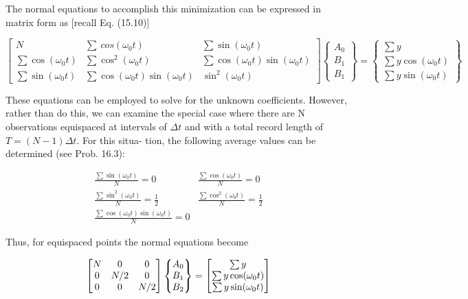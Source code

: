 \documentclass[../main.tex]{subfiles}
\begin{document}
\noindent The normal equations to accomplish this minimization can be expressed in matrix form as [recall Eq. (15.10)]

\begin{equation}
	\tag{16.12}
	\begin{bmatrix}
		N & \sum \ cos(\omega_0 t) & \sum \sin(\omega_0 t) \\
		\sum \cos(\omega_0 t) & \sum \cos^2 (\omega_0 t) & \sum \cos (\omega_0 t) \sin (\omega_0 t) \\
		\sum \sin(\omega_0 t) & \sum \cos (\omega_0 t) \sin (\omega_0 t) & \sin^2 (\omega_0 t)
	\end{bmatrix}
	\begin{Bmatrix}
		A_0 \\ B_1 \\ B_1
	\end{Bmatrix}
	=
	\begin{Bmatrix}
		\sum y \\ \sum y \cos(\omega_0 t) \\ \sum y \sin(\omega_0 t)
	\end{Bmatrix}
\end{equation}

These equations can be employed to solve for the unknown coefficients. However,
rather than do this, we can examine the special case where there are N observations equispaced at intervals of $\Delta t$ and with a total record length of $T = (N - 1)\Delta t$. For this situa-
tion, the following average values can be determined (see Prob. 16.3):

\begin{equation}
	\tag{16.13}
	\begin{matrix}
		\frac{\sum \sin (\omega_0 t)}{N} = 0 & \frac{\sum \cos (\omega_0 t)}{N} = 0 \\
		\frac{\sum \sin ^2 (\omega_0 t)}{N} = \frac{1}{2} & \frac{\sum \cos ^2 (\omega_0 t)}{N} = \frac{1}{2} \\
		\frac{\sum \cos (\omega_0 t) \sin(\omega_0 t)}{N} = 0
	\end{matrix}
\end{equation}

\noindent Thus, for equispaced points the normal equations become

\begin{equation}
	\notag
	\begin{bmatrix}
		N & 0 & 0 \\
		0 & N/2 & 0 \\
		0 & 0 & N/2
	\end{bmatrix}
	\begin{Bmatrix}
		A_0 \\ B_1 \\ B_2
	\end{Bmatrix}
	=
	\begin{bmatrix}
		\sum y \\
		\sum y \cos(\omega_0 t) \\
		\sum y \sin(\omega_0 t)
	\end{bmatrix}
\end{equation}
\end{document}
